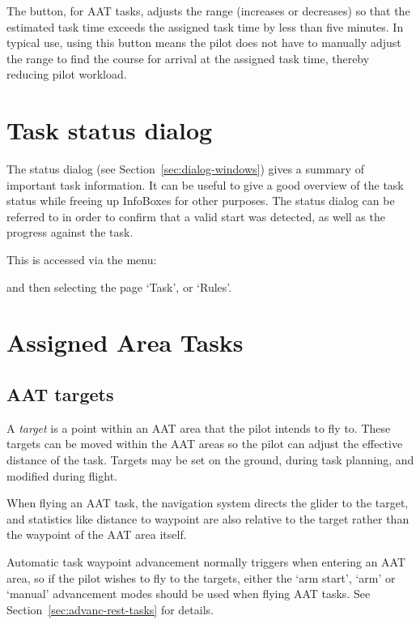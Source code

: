 \documentclass[a4paper,12pt]{refrep}
\begin{document}
The  button, for AAT tasks, adjusts the range
(increases or decreases) so that the estimated task time exceeds the
assigned task time by less than five minutes.  In typical use, using
this button means the pilot does not have to manually adjust the range
to find the course for arrival at the assigned task time, thereby
reducing pilot workload.

\section{Task status dialog}

The status dialog (see Section~\ref{sec:dialog-windows}) gives a
summary of important task information.  It can be useful to give a
good overview of the task status while freeing up InfoBoxes for other
purposes.  The status dialog can be referred to in order to confirm
that a valid start was detected, as well as the progress against the
task.

This is accessed via the menu:
\begin{quote}
\blink{}
\end{quote}
and then selecting the page `Task', or `Rules'.

\section{Assigned Area Tasks}\label{sec:aat-tasks}

\subsection*{AAT targets}

A {\em target} is a point within an AAT area that the pilot intends to
fly to.  These targets can be moved within the AAT areas so the pilot
can adjust the effective distance of the task.  Targets may be set on
the ground, during task planning, and modified during flight.

When flying an AAT task, the navigation system directs the glider to
the target, and statistics like distance to waypoint are also relative
to the target rather than the waypoint of the AAT area itself.

Automatic task waypoint advancement normally triggers when entering an
AAT area, so if the pilot wishes to fly to the targets, either the
`arm start', `arm' or `manual' advancement modes should be used when
flying AAT tasks.  See Section~\ref{sec:advanc-rest-tasks} for
details.
\end{document}
